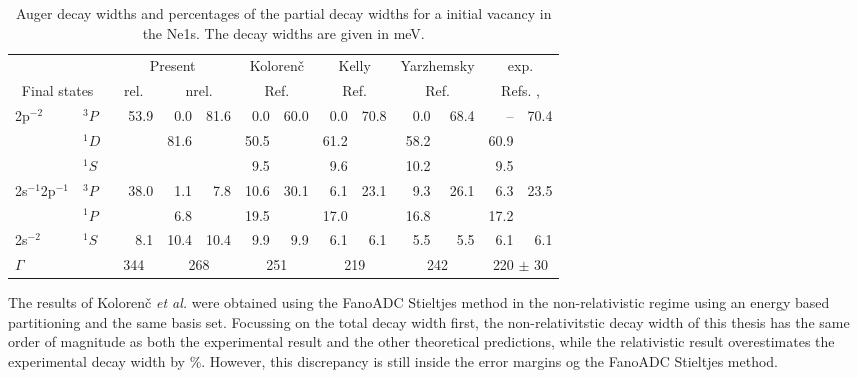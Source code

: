 \begin{table}[h]
  \centering
  \caption{Auger decay widths and percentages of the partial decay widths
           for a initial vacancy in the Ne1s. The decay widths are given in
           \unit[]{meV}.}
  \small
  \begin{tabular}{llrrrrrrrrrrrr}
   \toprule
    & & \multicolumn{4}{c}{Present} & \multicolumn{2}{c}{Koloren\v{c}} & \multicolumn{2}{c}{Kelly} & \multicolumn{2}{c}{Yarzhemsky} & \multicolumn{2}{c}{exp.}\\
   \multicolumn{2}{c}{Final states} & \multicolumn{2}{c}{rel.} & \multicolumn{2}{c}{nrel.} & \multicolumn{2}{c}{Ref.\cite{Kolorenc11}} & \multicolumn{2}{c}{Ref.\cite{Kelly75}} & \multicolumn{2}{c}{Ref.\cite{Yarzhemsky02}} & \multicolumn{2}{c}{Refs. \cite{Albiez90}, \cite{Avaldi95}}\\
   \midrule
   \multirow{3}{*}{2p$^{-2}$} & $^3P$ &  & \multirow{3}{*}{53.9} & 0.0 & \multirow{3}{*}{81.6} &  0.0 & \multirow{3}{*}{60.0} &  0.0 & \multirow{3}{*}{70.8} &  0.0 & \multirow{3}{*}{68.4} &  --  & \multirow{3}{*}{70.4}\\
                              & $^1D$ &     & & \multirow{2}{*}{81.6} & & 50.5 & & 61.2 & & 58.2 & & 60.9&\\
                              & $^1S$ &     & &  & &  9.5 & &  9.6 & & 10.2 & &  9.5&\\
   \midrule
 \multirow{2}{*}{2s$^{-1}$2p$^{-1}$} & $^3P$ &    & \multirow{2}{*}{38.0} & 1.1 & \multirow{2}{*}{7.8} & 10.6 & \multirow{2}{*}{30.1} &  6.1 & \multirow{2}{*}{23.1} &  9.3 & \multirow{2}{*}{26.1} &  6.3 & \multirow{2}{*}{23.5}\\
                              & $^1P$ &      & &  6.8 & & 19.5 & & 17.0 & & 16.8 & & 17.2&\\
   \midrule
      2s$^{-2}$               & $^1S$ &      & 8.1 & 10.4 & 10.4 &  9.9 & 9.9 &  6.1 & 6.1 &  5.5 & 5.5 &  6.1& 6.1\\
   \midrule
   $\Gamma$  & & \multicolumn{2}{c}{344}  & \multicolumn{2}{c}{268} & \multicolumn{2}{c}{251} & \multicolumn{2}{c}{219} & \multicolumn{2}{c}{242} & \multicolumn{2}{c}{220 $\pm$ 30}\\
   \bottomrule
  \end{tabular}
  \label{table:Ne_gammas}
\end{table}

The results of Koloren\v{c} \textit{et al.} \cite{Kolorenc11} were obtained using
the FanoADC Stieltjes method in the non-relativistic regime using an
energy based partitioning and the same basis set.
Focussing on the total decay width first, the non-relativitstic decay width
of this thesis has the same order of magnitude as both the experimental result
and the other theoretical predictions, while the relativistic result
overestimates the experimental decay width by \unit[56]{\%}. However, this
discrepancy is still inside the error margins og the FanoADC Stieltjes method.

